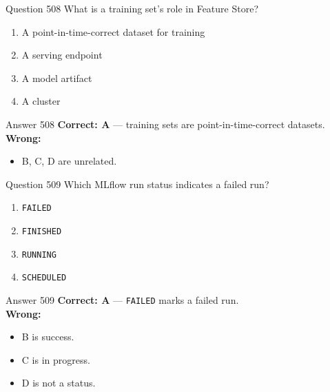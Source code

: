 \documentclass[aspectratio=169,11pt]{beamer}
\begin{document}
	\begin{frame}{Question 508}
		What is a training set's role in Feature Store?
		\begin{enumerate}[label=\Alph*.]
			\item A point-in-time-correct dataset for training
			\item A serving endpoint
			\item A model artifact
			\item A cluster
		\end{enumerate}
	\end{frame}
	\begin{frame}{Answer 508}
		\textbf{Correct: A} --- training sets are point-in-time-correct datasets.\\
		\vspace{0.5em}
		\textbf{Wrong:}
		\begin{itemize}
			\item B, C, D are unrelated.
		\end{itemize}
	\end{frame}
	
	\begin{frame}{Question 509}
		Which MLflow run status indicates a failed run?
		\begin{enumerate}[label=\Alph*.]
			\item \texttt{FAILED}
			\item \texttt{FINISHED}
			\item \texttt{RUNNING}
			\item \texttt{SCHEDULED}
		\end{enumerate}
	\end{frame}
	\begin{frame}{Answer 509}
		\textbf{Correct: A} --- \texttt{FAILED} marks a failed run.\\
		\vspace{0.5em}
		\textbf{Wrong:}
		\begin{itemize}
			\item B is success.
			\item C is in progress.
			\item D is not a status.
		\end{itemize}
	\end{frame}
	
\end{document}
